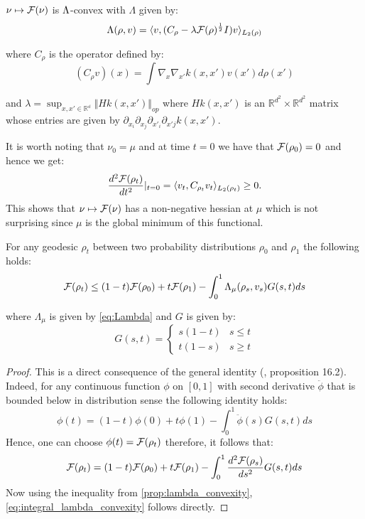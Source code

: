 \begin{proposition}
\label{prop:lambda_convexity}$\nu\mapsto {{\mathcal F}}(\nu)$ is $\text{\ensuremath{\Lambda}}$-convex
with $\Lambda$ given by:
\begin{equation}
\Lambda(\rho,v)=\langle v,(C_{\rho}-\lambda {{\mathcal F}}(\rho)^{\frac{1}{2}}I)v\rangle_{L_{2}(\rho)}\label{eq:Lambda}
\end{equation}

where $C_{\rho}$ is the operator defined by:
\[
(C_{\rho}v)(x)=\int\nabla_{x}\nabla_{x'}k(x,x')v(x')d\rho(x')
\]

and $\lambda=\sup_{x,x'\in\mathbb{\mathbb{R}^{d}}}\Vert Hk(x,x')\Vert_{op}$
where $Hk(x,x')$ is an $\mathbb{R}^{d^{2}}\times\mathbb{R}^{d^{2}}$
matrix whose entries are given by $\partial_{x_{i}}\partial_{x_{j}}\partial_{x'_{i}}\partial_{x'j}k(x,x')$.
\end{proposition}
%
%
It is worth noting that $\nu_{0}=\mu$ and at time $t=0$ we have
that ${{\mathcal F}}(\rho_{0})=0$ and hence we get:
\[
\frac{d^{2}{{\mathcal F}}(\rho_{t})}{dt^{2}}\vert_{t=0}=\langle v_{t},C_{\rho_{t}}v_{t}\rangle_{L_{2}(\rho_{t})}\geq0.
\]
This shows that $\nu\mapsto {{\mathcal F}}(\nu)$ has a non-negative
hessian at $\mu$ which is not surprising since $\mu$ is the global
minimum of this functional.
\begin{corollary}\label{cor:integral_lambda_convexity}
For any geodesic $\rho_{t}$ between two probability distributions
$\rho_{0}$ and $\rho_{1}$ the following holds:
\begin{equation}
{{\mathcal F}}(\rho_{t})\leq(1-t){{\mathcal F}}(\rho_{0})+t{{\mathcal F}}(\rho_{1})-\int_{0}^{1}\Lambda_{\mu}(\rho_{s},v_{s})G(s,t)ds\label{eq:integral_lambda_convexity}
\end{equation}

where $\Lambda_{\mu}$ is given by \ref{eq:Lambda} and $G$ is given
by:
\[
G(s,t)=\begin{cases}
s(1-t) & s\leq t\\
t(1-s) & s\geq t
\end{cases}
\]
\end{corollary}
%
\begin{proof}
This is a direct consequence of the general identity (\cite{Villani:2009},
proposition 16.2). Indeed, for any continuous function $\phi$ on
$[0,1]$ with second derivative $\ddot{\phi}$ that is bounded below
in distribution sense the following identity holds:
\[
\phi(t)=(1-t)\phi(0)+t\phi(1)-\int_{0}^{1}\ddot{\phi}(s)G(s,t)ds
\]
Hence, one can choose $\phi(t)={{\mathcal F}}(\rho_{t})$ therefore,
it follows that:
\[
{{\mathcal F}}(\rho_{t})=(1-t){{\mathcal F}}(\rho_{0})+t{{\mathcal F}}(\rho_{1})-\int_{0}^{1}\frac{d^{2}{{\mathcal F}}(\rho_{s})}{ds^{2}}G(s,t)ds
\]
Now using the inequality from \ref{prop:lambda_convexity}, \ref{eq:integral_lambda_convexity}
follows directly. 
\end{proof}
